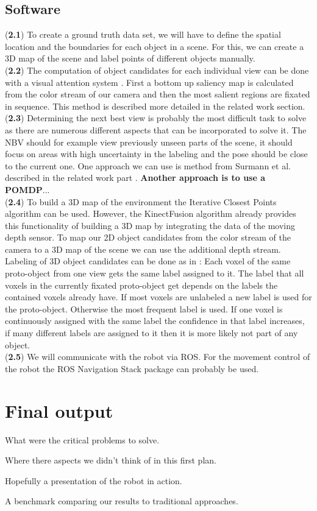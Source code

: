\documentclass[a4paper,11pt,english]{article}
\begin{document}
\subsection{Software}
(\textbf{2.1}) To create a ground truth data set, we will have to define the spatial location and the boundaries for each object in a scene.
For this, we can create a 3D map of the scene and label points of different objects manually.\\
(\textbf{2.2}) The computation of object candidates for each individual view can be done with a visual attention system \cite{garcia2013computational}.
First a bottom up saliency map is calculated from the color stream of our camera and then the most salient regions are fixated in sequence. This method is described more detailed in the related work section.\\
(\textbf{2.3}) Determining the next best view is probably the most difficult task to solve as there are numerous different aspects that can be incorporated to solve it.
The NBV should for example view previously unseen parts of the scene, it should focus on areas with high uncertainty in the labeling and the pose should be close to the current one.
One approach we can use is method from Surmann et al. described in the related work part \cite{surmann2003autonomous}.
\textbf{Another approach is to use a POMDP}...\\
(\textbf{2.4}) To build a 3D map of the environment the Iterative Closest Points algorithm can be used.
However, the KinectFusion algorithm already provides this functionality of building a 3D map by integrating the data of the moving depth sensor.
To map our 2D object candidates from the color stream of the camera to a 3D map of the scene we can use the additional depth stream.
Labeling of 3D object candidates can be done as in \cite{garcia2013computational}:
Each voxel of the same proto-object from one view gets the same label assigned to it.
The label that all voxels in the currently fixated proto-object get depends on the labels the contained voxels already have.
If most voxels are unlabeled a new label is used for the proto-object.
Otherwise the most frequent label is used.
If one voxel is continuously assigned with the same label the confidence in that label increases, if many different labels are assigned to it then it is more likely not part of any object.\\
(\textbf{2.5}) We will communicate with the robot via ROS. For the movement control of the robot the ROS Navigation Stack package can probably be used.

\section{Final output}
What were the critical problems to solve.

Where there aspects we didn't think of in this first plan.

Hopefully a presentation of the robot in action.

A benchmark comparing our results to traditional approaches. 




\end{document}
